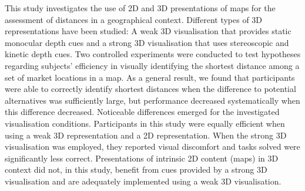 {{\begin{enumerate}
This study investigates the use of 2D and 3D presentations of maps for the assessment of distances in a geographical context. Different types of 3D representations have been studied: A weak 3D visualisation that provides static monocular depth cues and a strong 3D visualisation that uses stereoscopic and kinetic depth cues. Two controlled experiments were conducted to test hypotheses regarding subjects' efficiency in visually identifying the shortest distance among a set of market locations in a map. As a general result, we found that participants were able to correctly identify shortest distances when the difference to potential alternatives was sufficiently large, but performance decreased systematically when this difference decreased. Noticeable differences emerged for the investigated visualisation conditions. Participants in this study were equally efficient when using a weak 3D representation and a 2D representation. When the strong 3D visualisation was employed, they reported visual discomfort and tasks solved were significantly less correct. Presentations of intrinsic 2D content (maps) in 3D context did not, in this study, benefit from cues provided by a strong 3D visualisation and are adequately implemented using a weak 3D visualisation.\vspace*{-1.3mm}
\\ \aabstract

\end{enumerate}}}

